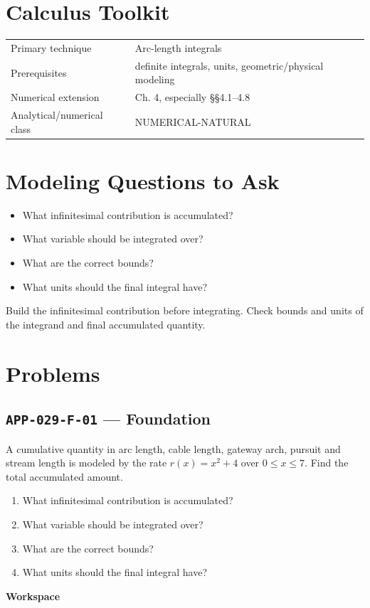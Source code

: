 \documentclass[11pt]{book}
\newcommand{\pid}[1]{\texttt{#1}}
\newcommand{\workspace}{\par\vspace{0.7in}\hrulefill\par\vspace{0.55in}\hrulefill\par}
\begin{document}
\section*{Calculus Toolkit}
\begin{tabularx}{\textwidth}{@{}lX@{}}\toprule
Primary technique & Arc-length integrals \\
Prerequisites & definite integrals, units, geometric/physical modeling \\
Numerical extension & Ch. 4, especially §§4.1–4.8 \\
Analytical/numerical class & NUMERICAL-NATURAL \\
\bottomrule\end{tabularx}
\section*{Modeling Questions to Ask}\begin{itemize}
\item What infinitesimal contribution is accumulated?
\item What variable should be integrated over?
\item What are the correct bounds?
\item What units should the final integral have?
\end{itemize}
\begin{errorbox}Build the infinitesimal contribution before integrating. Check bounds and units of the integrand and final accumulated quantity.\end{errorbox}
\section*{Problems}
\subsection*{\pid{APP-029-F-01} — Foundation}
\begin{problembox}
A cumulative quantity in arc length, cable length, gateway arch, pursuit and stream length is modeled by the rate $r(x)=x^2+4$ over $0\le x\le 7$. Find the total accumulated amount.
\end{problembox}
\begin{promptbox}\begin{enumerate}
\item What infinitesimal contribution is accumulated?
\item What variable should be integrated over?
\item What are the correct bounds?
\item What units should the final integral have?
\end{enumerate}\end{promptbox}
\textbf{Workspace}\workspace
{}
\end{document}
